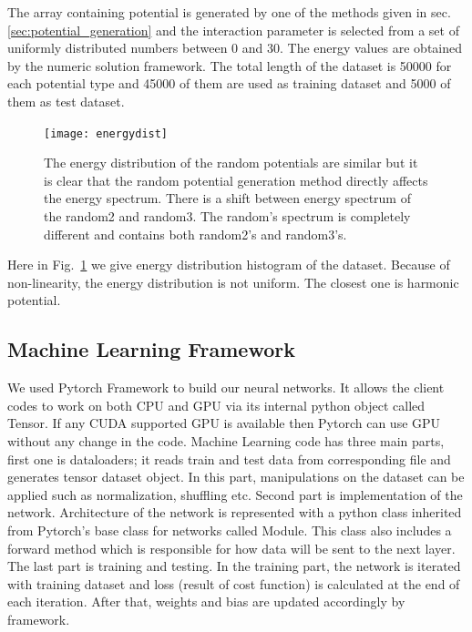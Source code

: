 \documentclass[a4paper,times,hidelinks,12pt]{article}
\begin{document}
The array containing potential is generated by one of the methods given in sec. \ref{sec:potential_generation} and the interaction parameter is selected from a set of uniformly distributed numbers between 0 and 30. The energy values are obtained by the numeric solution framework. The total length of the dataset is 50000 for each potential type and 45000 of them are used as training dataset and 5000 of them as test dataset. 

\graphicspath{{"../figs/dataresults/"}}
\begin{figure}[H]
    \centering
    \texttt{[image: energydist]}
\caption{The energy distribution of the random potentials are similar but it is clear that the random potential generation method directly affects the energy spectrum. There is a shift between energy spectrum of the random2 and random3. The random's spectrum is completely different and contains both random2's and random3's.}
\label{fig:energy_dist}
\end{figure}

Here in Fig.~\ref{fig:energy_dist} we give energy distribution histogram of the dataset. Because of non-linearity, the energy distribution is not uniform. The closest one is harmonic potential.


\subsection{Machine Learning Framework}

We used Pytorch Framework \cite{paszke2017automatic} to build our neural networks. It allows the client codes to work on both CPU and GPU via its internal python object called Tensor. If any CUDA supported GPU is available then Pytorch can use GPU without any change in the code. Machine Learning code has three main parts, first one is dataloaders; it reads train and test data from corresponding file and generates tensor dataset object. In this part, manipulations on the dataset can be applied such as normalization, shuffling etc. Second part is implementation of the network. Architecture of the network is represented with a python class inherited from Pytorch's base class for networks called Module. This class also includes a forward method which is responsible for how data will be sent to the next layer. The last part is training and testing. In the training part, the network is iterated with training dataset and loss (result of cost function) is calculated at the end of each iteration. After that, weights and bias are updated accordingly by framework.
\end{document}
